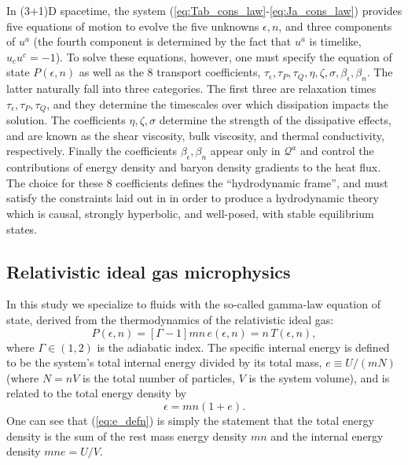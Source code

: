 \documentclass[%
notitlepage,
superscriptaddress,
nofootinbib,
amsmath,
amssymb,
aps,
twocolumn
]{revtex4-1}
\begin{document}
In (3+1)D spacetime, the system (\ref{eq:Tab_cons_law}-\ref{eq:Ja_cons_law}) 
provides five equations of motion to evolve the five unknowns $\epsilon, n$, and three components of $u^{a}$ (the fourth component is determined by the fact that $u^a$ is timelike, $u_{c} u^{c} = -1$).  To solve these equations, however, one must specify the equation of state $P(\epsilon, n)$ as well as the 8 transport coefficients, $\tau_{\epsilon}, \tau_{P}, \tau_{Q}, \eta, \zeta, \sigma, \beta_{\epsilon}, \beta_{n}$.  The latter naturally fall into three categories.  The first three are relaxation times $\tau_{\epsilon}, \tau_{P}, \tau_{Q}$, and they determine the timescales over which dissipation impacts the solution.  The coefficients $\eta, \zeta, \sigma$ determine the strength of the dissipative effects, and are known as the shear viscosity, bulk viscosity, and thermal conductivity, respectively.  Finally the coefficients $\beta_{\epsilon}, \beta_{n}$ appear only in $\mathcal{Q}^{a}$ and control the contributions of energy density and baryon density gradients to the heat flux.  The choice for these 8 coefficients defines the ``hydrodynamic frame'', and must satisfy the constraints laid out in \cite{Bemfica:2020zjp} in order to produce a hydrodynamic theory which is causal, strongly hyperbolic, and well-posed, with stable equilibrium states.

\subsection{Relativistic ideal gas microphysics}

In this study we specialize to fluids with the so-called gamma-law equation of state, derived from the thermodynamics of the relativistic ideal gas:
\begin{equation} \label{eq:EOS}
P(\epsilon, n) = [\Gamma - 1] m n \, e(\epsilon, n) = n \, T(\epsilon, n),
\end{equation}
where $\Gamma \in (1,2)$ is the adiabatic index.  The specific internal energy is defined to be the system's total internal energy divided by its total mass, $e \equiv U/(m N)$ (where $N = n V$ is the total number of particles, $V$ is the system volume), and is related to the total energy density by
\begin{equation} \label{eq:e_defn}
\epsilon = m n (1 + e).
\end{equation}
One can see that (\ref{eq:e_defn}) is simply the statement that the total energy density is the sum of the rest mass energy density $m n$ and the internal energy density $m n e = U/V$.
\end{document}
